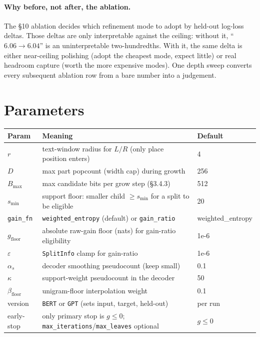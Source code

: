 \documentclass[11pt]{article}
\newcommand{\code}[1]{\texttt{#1}}
\newcommand{\gfn}{\code{gain\_fn}}
\begin{document}
\paragraph{Why before, not after, the ablation.} The \S10 ablation decides which refinement mode to adopt by held-out log-loss deltas. Those deltas are only interpretable against the ceiling: without it, ``$6.06\to6.04$'' is an uninterpretable two-hundredths. With it, the same delta is either near-ceiling polishing (adopt the cheapest mode, expect little) or real headroom capture (worth the more expensive modes). One depth sweep converts every subsequent ablation row from a bare number into a judgement.


\section{Parameters}

\begin{center}
\begin{longtable}{@{}lll@{}}
\toprule
Param & Meaning & Default\\
\midrule
\endhead
$r$ & text-window radius for $L/R$ (only place position enters) & 4\\
$D$ & max part popcount (width cap) during growth & 256\\
$B_{\max}$ & max candidate bits per grow step (\S3.4.3) & 512\\
$s_{\min}$ & support floor: smaller child $\ge s_{\min}$ for a split to be eligible & 20\\
\gfn & \code{weighted\_entropy} (default) or \code{gain\_ratio} & weighted\_entropy\\
$g_{\text{floor}}$ & absolute raw-gain floor (nats) for gain-ratio eligibility & 1e-6\\
$\varepsilon$ & \code{SplitInfo} clamp for gain-ratio & 1e-6\\
$\alpha_s$ & decoder smoothing pseudocount (keep small) & 0.1\\
$\kappa$ & support-weight pseudocount in the decoder & 50\\
$\beta_{\text{floor}}$ & unigram-floor interpolation weight & 0.1\\
version & \code{BERT} or \code{GPT} (sets input, target, held-out) & per run\\
early-stop & only primary stop is $g\le0$; \code{max\_iterations}/\code{max\_leaves} optional & $g\le0$\\
\bottomrule
\end{longtable}
\end{center}
\end{document}
